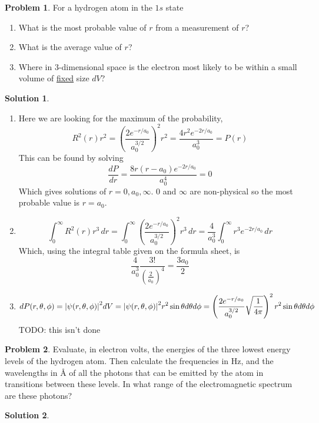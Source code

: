 \documentclass[10pt]{article}
\theoremstyle{definition}
\newtheorem{problem}{Problem}
\newtheorem{soln}{Solution}
\begin{document}
\begin{problem}
For a hydrogen atom in the $1s$ state
\begin{enumerate}[label=(\alph*)]
  \item What is the most probable value of $r$ from a measurement of $r$?
  \item What is the average value of $r$?
  \item Where in 3-dimensional space is the electron most likely to be within a small volume of \underline{fixed} size $dV$?
\end{enumerate}
\end{problem}
\begin{soln}~
  \begin{enumerate}[label=(\alph*)]
    \item Here we are looking for the maximum of the probability,
          $$R^2(r)r^2=\left(\frac{2e^{-r/a_0}}{a_0^{3/2}}\right)^2r^2=\frac{4r^2e^{-2r/a_0}}{a_0^3}=P(r)$$
          This can be found by solving
          $$\frac{dP}{dr}=\frac{8r(r-a_0)e^{-2r/a_0}}{a_0^4}=0$$
          Which gives solutions of $r=0,a_0,\infty$. $0$ and $\infty$ are non-physical so the most probable value is $r=a_0$.
    \item $$\int_0^\infty R^2(r)r^3\,dr
            =\int_0^\infty\left(\frac{2e^{-r/a_0}}{a_0^{3/2}}\right)^2r^3\,dr
            =\frac{4}{a_0^{3}}\int_0^\infty r^3e^{-2r/a_0}\,dr$$
          Which, using the integral table given on the formula sheet, is
          $$\frac{4}{a_0^{3}}\frac{3!}{\left(\frac{2}{a_0}\right)^4}=\frac{3a_0}{2}$$
    \item $$dP(r,\theta,\phi)=\abs{\psi(r,\theta,\phi)}^2dV=\abs{\psi(r,\theta,\phi)}^2r^2\sin\theta d\theta d\phi
            =\left(\frac{2e^{-r/a_0}}{a_0^{3/2}}\sqrt{\frac{1}{4\pi}}\right)^2r^2\sin\theta d\theta d\phi
          $$
          TODO: this isn't done
  \end{enumerate}
\end{soln}

\begin{problem}
Evaluate, in electron volts, the energies of the three lowest energy levels of the hydrogen atom. Then
calculate the frequencies in $\unit{\hertz}$, and the wavelengths in $\unit{\angstrom}$ of all the photons that can be emitted by the
atom in transitions between these levels. In what range of the electromagnetic spectrum are these photons?
\end{problem}
\begin{soln}
\end{soln}
\end{document}

